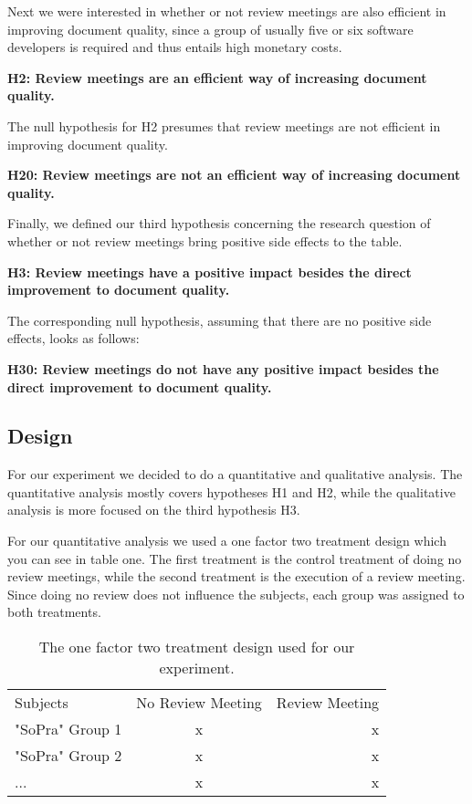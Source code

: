 Next we were interested in whether or not review meetings are also efficient in improving document quality, since a group of usually five or six software developers is required and thus entails high monetary costs.

\textbf{H2: Review meetings are an efficient way of increasing document quality.}

The null hypothesis for H2 presumes that review meetings are not efficient in improving document quality.

\textbf{H20: Review meetings are not an efficient way of increasing document quality.}

Finally, we defined our third hypothesis concerning the research question of whether or not review meetings bring positive side effects to the table.

\textbf{H3: Review meetings have a positive impact besides the direct improvement to document quality.}

The corresponding null hypothesis, assuming that there are no positive side effects, looks as follows:

\textbf{H30: Review meetings do not have any positive impact besides the direct improvement to document quality.}

\subsection{Design}

For our experiment we decided to do a quantitative and qualitative analysis. The quantitative analysis mostly covers hypotheses H1 and H2, while the qualitative analysis is more focused on the third hypothesis H3.

For our quantitative analysis we used a one factor two treatment design which you can see in table one. The first treatment is the control treatment of doing no review meetings, while the second treatment is the execution of a review meeting. Since doing no review does not influence the subjects, each group was assigned to both treatments. 


\begin{table}
\centering
\begin{tabular}{lcr}
  \rowcolor{heading}Subjects & No Review Meeting & Review Meeting \\
  \rowcolor{a}"SoPra" Group 1 & x & x \\
  \rowcolor{b}"SoPra" Group 2 & x & x \\
  \rowcolor{a}... & x & x \\
\end{tabular}
\caption{The one factor two treatment design used for our experiment.}
\end{table}


